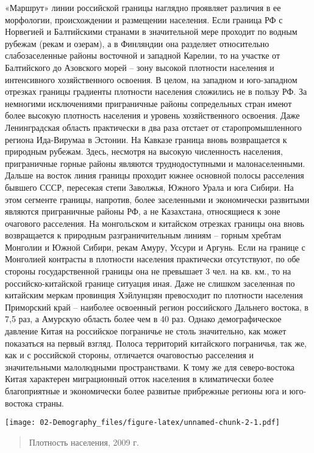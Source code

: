 \documentclass[]{book}
\begin{document}
«Маршрут» линии российской границы наглядно проявляет различия в ее
морфологии, происхождении и размещении населения. Если граница РФ с
Норвегией и Балтийскими странами в значительной мере проходит по водным
рубежам (рекам и озерам), а в Финляндии она разделяет относительно
слабозаселенные районы восточной и западной Карелии, то на участке от
Балтийского до Азовского морей -- зону высокой плотности населения и
интенсивного хозяйственного освоения. В целом, на западном и
юго-западном отрезках границы градиенты плотности населения сложились не
в пользу РФ. За немногими исключениями приграничные районы сопредельных
стран имеют более высокую плотность населения и уровень хозяйственного
освоения. Даже Ленинградская область практически в два раза отстает от
старопромышленного региона Ида-Вирумаа в Эстонии. На Кавказе граница
вновь возвращается к природным рубежам. Здесь, несмотря на высокую
численность населения, приграничные горные районы являются
труднодоступными и малонаселенными. Дальше на восток линия границы
проходит южнее основной полосы расселения бывшего СССР, пересекая степи
Заволжья, Южного Урала и юга Сибири. На этом сегменте границы, напротив,
более заселенными и экономически развитыми являются приграничные районы
РФ, а не Казахстана, относящиеся к зоне очагового расселения. На
монгольском и китайском отрезках границы она вновь возвращается к
природным разграничительным линиям -- горным хребтам Монголии и Южной
Сибири, рекам Амуру, Уссури и Аргунь. Если на границе с Монголией
контрасты в плотности населения практически отсутствуют, по обе стороны
государственной границы она не превышает 3 чел. на кв. км., то на
российско-китайской границе ситуация иная. Даже не слишком заселенная по
китайским меркам провинция Хэйлунцзян превосходит по плотности населения
Приморский край -- наиболее освоенный регион российского Дальнего
востока, в 7,5 раз, а Амурскую область более чем в 40 раз. Однако
демографическое давление Китая на российское пограничье не столь
значительно, как может показаться на первый взгляд. Полоса территорий
китайского пограничья, так же, как и с российской стороны, отличается
очаговостью расселения и значительными малолюдными пространствами. К
тому же для северо-востока Китая характерен миграционный отток населения
в климатически более благоприятные и экономически более развитые
прибрежные регионы юга и юго-востока страны.

\texttt{[image: 02-Demography\_files/figure-latex/unnamed-chunk-2-1.pdf]}

\begin{quote}
Плотность населения, 2009 г.
\end{quote}
\end{document}
